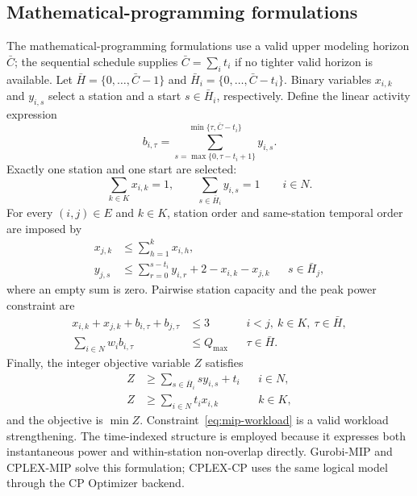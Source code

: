 \documentclass[]{interact}
\theoremstyle{plain}
\theoremstyle{definition}
\theoremstyle{remark}
\newcommand{\Qmax}{Q_{\max}}
\begin{document}
\subsection{Mathematical-programming formulations}

The mathematical-programming formulations use a valid upper modeling horizon $\bar C$; the sequential schedule supplies $\bar C=\sum_i t_i$ if no tighter valid horizon is available. Let $\bar H=\{0,\ldots,\bar C-1\}$ and $\bar H_i=\{0,\ldots,\bar C-t_i\}$. Binary variables $x_{i,k}$ and $y_{i,s}$ select a station and a start $s\in\bar H_i$, respectively. Define the linear activity expression
\begin{equation}
b_{i,\tau}=\sum_{s=\max\{0,\tau-t_i+1\}}^{\min\{\tau,\bar C-t_i\}}y_{i,s}.
\label{eq:mip-activity}
\end{equation}
Exactly one station and one start are selected:
\begin{equation}
\sum_{k\in K}x_{i,k}=1,
\qquad
\sum_{s\in\bar H_i}y_{i,s}=1
\qquad i\in N.
\label{eq:mip-one}
\end{equation}
For every $(i,j)\in E$ and $k\in K$, station order and same-station temporal order are imposed by
\begin{align}
x_{j,k}&\leq\sum_{h=1}^{k}x_{i,h}, \label{eq:mip-station-prec}\\
y_{j,s}&\leq\sum_{r=0}^{s-t_i}y_{i,r}+2-x_{i,k}-x_{j,k}
&&s\in\bar H_j, \label{eq:mip-time-prec}
\end{align}
where an empty sum is zero. Pairwise station capacity and the peak power constraint are
\begin{align}
x_{i,k}+x_{j,k}+b_{i,\tau}+b_{j,\tau}&\leq3
&&i<j,\ k\in K,\ \tau\in\bar H, \label{eq:mip-nonoverlap}\\
\sum_{i\in N}w_i b_{i,\tau}&\leq\Qmax
&&\tau\in\bar H. \label{eq:mip-power}
\end{align}
Finally, the integer objective variable $Z$ satisfies
\begin{align}
Z&\geq\sum_{s\in\bar H_i}s y_{i,s}+t_i &&i\in N, \label{eq:mip-z}\\
Z&\geq\sum_{i\in N}t_i x_{i,k} &&k\in K, \label{eq:mip-workload}
\end{align}
and the objective is $\min Z$. Constraint~\eqref{eq:mip-workload} is a valid workload strengthening. The time-indexed structure is employed because it expresses both instantaneous power and within-station non-overlap directly. Gurobi-MIP and CPLEX-MIP solve this formulation; CPLEX-CP uses the same logical model through the CP Optimizer backend.
\end{document}
